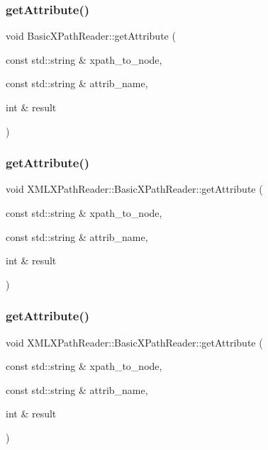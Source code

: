 \subsubsection{\texorpdfstring{getAttribute()}{getAttribute()}\hspace{0.1cm}{\footnotesize\ttfamily [4/30]}}
{\footnotesize\ttfamily void Basic\+X\+Path\+Reader\+::get\+Attribute (\begin{DoxyParamCaption}\item[{const std\+::string \&}]{xpath\+\_\+to\+\_\+node,  }\item[{const std\+::string \&}]{attrib\+\_\+name,  }\item[{int \&}]{result }\end{DoxyParamCaption})}

\mbox{\label{classXMLXPathReader_1_1BasicXPathReader_a67a27824521cbe011f99c2cafff83239}} 
\subsubsection{\texorpdfstring{getAttribute()}{getAttribute()}\hspace{0.1cm}{\footnotesize\ttfamily [5/30]}}
{\footnotesize\ttfamily void X\+M\+L\+X\+Path\+Reader\+::\+Basic\+X\+Path\+Reader\+::get\+Attribute (\begin{DoxyParamCaption}\item[{const std\+::string \&}]{xpath\+\_\+to\+\_\+node,  }\item[{const std\+::string \&}]{attrib\+\_\+name,  }\item[{int \&}]{result }\end{DoxyParamCaption})}

\mbox{\label{classXMLXPathReader_1_1BasicXPathReader_a67a27824521cbe011f99c2cafff83239}} 
\subsubsection{\texorpdfstring{getAttribute()}{getAttribute()}\hspace{0.1cm}{\footnotesize\ttfamily [6/30]}}
{\footnotesize\ttfamily void X\+M\+L\+X\+Path\+Reader\+::\+Basic\+X\+Path\+Reader\+::get\+Attribute (\begin{DoxyParamCaption}\item[{const std\+::string \&}]{xpath\+\_\+to\+\_\+node,  }\item[{const std\+::string \&}]{attrib\+\_\+name,  }\item[{int \&}]{result }\end{DoxyParamCaption})}

